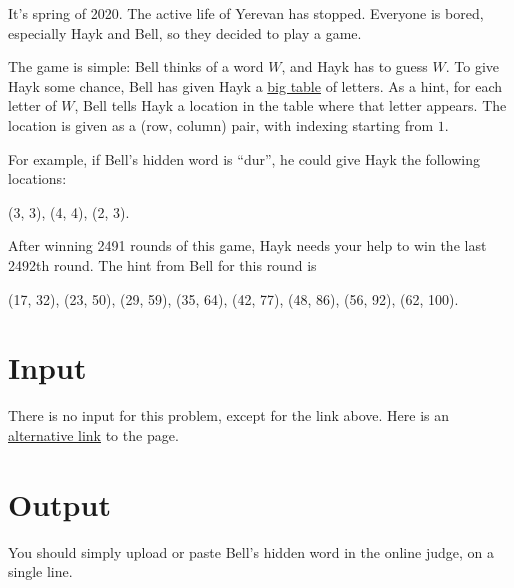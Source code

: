 It's spring of 2020.
The active life of Yerevan has stopped.
Everyone is bored, especially Hayk and Bell, so they decided to play a game.

The game is simple: Bell thinks of a word $W$, and Hayk has to guess $W$.
To give Hayk some chance, Bell has given Hayk a \href{http://ejudge.rau.am/ejudge/hayktable.html}{big table} of letters.
As a hint, for each letter of $W$, Bell tells Hayk a location in the table where that letter appears.
The location is given as a (row, column) pair, with indexing starting from $1$.

For example, if Bell's hidden word is ``dur'', he could give Hayk the following locations:
\begin{center}
    (3, 3), (4, 4), (2, 3).
\end{center}

After winning 2491 rounds of this game, Hayk needs your help to win the last 2492th round.
The hint from Bell for this round is
\begin{center}
    (17, 32), (23, 50), (29, 59), (35, 64), (42, 77), (48, 86), (56, 92), (62, 100).
\end{center}

\section*{Input}
There is no input for this problem, except for the link above.
Here is an \href{http://167.71.248.201/ejudge/hayktable.html}{alternative link} to the page.

\section*{Output}
You should simply upload or paste Bell's hidden word in the online judge, on a single line.

